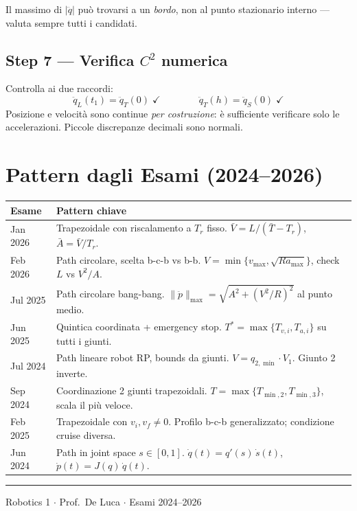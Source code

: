 \documentclass[10pt,a4paper]{article}
\begin{document}
\begin{redbox}
Il massimo di $|\ddot{q}|$ pu\`o trovarsi a un \textit{bordo}, non al punto stazionario
interno --- valuta sempre tutti i candidati.
\end{redbox}

\subsection{Step 7 --- Verifica $C^2$ numerica}

Controlla ai due raccordi:
\[
\ddot{q}_L(t_1) = \ddot{q}_T(0) \;\checkmark \qquad\qquad \ddot{q}_T(h) = \ddot{q}_S(0) \;\checkmark
\]
Posizione e velocit\`a sono continue \emph{per costruzione}: \`e sufficiente
verificare solo le accelerazioni. Piccole discrepanze decimali sono normali.


\section{Pattern dagli Esami (2024--2026)}

\begin{center}
\renewcommand{\arraystretch}{1.4}
\begin{tabular}{@{}p{2.6cm}p{11.5cm}@{}}
\toprule
\textbf{Esame} & \textbf{Pattern chiave}\\
\midrule
Jan 2026 & Trapezoidale con riscalamento a $T_r$ fisso. $\bar{V} = L/(\bar{T}-T_r)$, $\bar{A} = \bar{V}/T_r$.\\
Feb 2026 & Path circolare, scelta b-c-b vs b-b. $V = \min\{v_{\max}, \sqrt{Ra_{\max}}\}$, check $L$ vs $V^2/A$.\\
Jul 2025 & Path circolare bang-bang. $\|\ddot{p}\|_{\max} = \sqrt{A^2 + (V^2/R)^2}$ al punto medio.\\
Jun 2025 & Quintica coordinata + emergency stop. $T^* = \max\{T_{v,i}, T_{a,i}\}$ su tutti i giunti.\\
Jul 2024 & Path lineare robot RP, bounds da giunti. $V = q_{2,\min}\cdot V_1$. Giunto 2 inverte.\\
Sep 2024 & Coordinazione 2 giunti trapezoidali. $T = \max\{T_{\min,2}, T_{\min,3}\}$, scala il pi\`u veloce.\\
Feb 2025 & Trapezoidale con $v_i, v_f \neq 0$. Profilo b-c-b generalizzato; condizione cruise diversa.\\
Jun 2024 & Path in joint space $s\in[0,1]$. $\dot{q}(t) = q'(s)\,\dot{s}(t)$, $\dot{p}(t) = J(q)\,\dot{q}(t)$.\\
\bottomrule
\end{tabular}
\end{center}

\vspace{6pt}
\hrule
\vspace{4pt}
{\centering\small Robotics 1 $\cdot$ Prof.\ De Luca $\cdot$ Esami 2024--2026\par}
\end{document}
